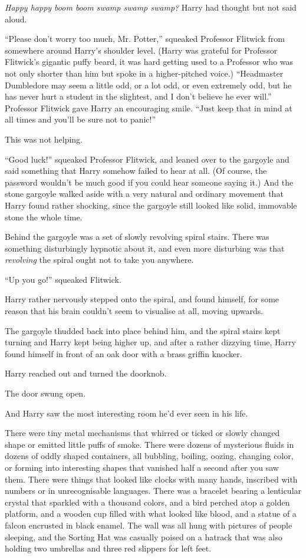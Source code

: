 \emph{Happy happy boom boom swamp swamp swamp?} Harry had thought but not said aloud.

``Please don't worry too much, Mr. Potter,'' squeaked Professor Flitwick from somewhere around Harry's shoulder level. (Harry was grateful for Professor Flitwick's gigantic puffy beard, it was hard getting used to a Professor who was not only shorter than him but spoke in a higher-pitched voice.) ``Headmaster Dumbledore may seem a little odd, or a lot odd, or even extremely odd, but he has never hurt a student in the slightest, and I don't believe he ever will.'' Professor Flitwick gave Harry an encouraging smile. ``Just keep that in mind at all times and you'll be sure not to panic!''

This was not helping.

``Good luck!'' squeaked Professor Flitwick, and leaned over to the gargoyle and said something that Harry somehow failed to hear at all. (Of course, the password wouldn't be much good if you could hear someone saying it.) And the stone gargoyle walked aside with a very natural and ordinary movement that Harry found rather shocking, since the gargoyle still looked like solid, immovable stone the whole time.

Behind the gargoyle was a set of slowly revolving spiral stairs. There was something disturbingly hypnotic about it, and even more disturbing was that \emph{revolving} the spiral ought not to take you anywhere.

``Up you go!'' squeaked Flitwick.

Harry rather nervously stepped onto the spiral, and found himself, for some reason that his brain couldn't seem to visualise at all, moving upwards.

The gargoyle thudded back into place behind him, and the spiral stairs kept turning and Harry kept being higher up, and after a rather dizzying time, Harry found himself in front of an oak door with a brass griffin knocker.

Harry reached out and turned the doorknob.

The door swung open.

And Harry saw the most interesting room he'd ever seen in his life.

There were tiny metal mechanisms that whirred or ticked or slowly changed shape or emitted little puffs of smoke. There were dozens of mysterious fluids in dozens of oddly shaped containers, all bubbling, boiling, oozing, changing color, or forming into interesting shapes that vanished half a second after you saw them. There were things that looked like clocks with many hands, inscribed with numbers or in unrecognisable languages. There was a bracelet bearing a lenticular crystal that sparkled with a thousand colors, and a bird perched atop a golden platform, and a wooden cup filled with what looked like blood, and a statue of a falcon encrusted in black enamel. The wall was all hung with pictures of people sleeping, and the Sorting Hat was casually poised on a hatrack that was also holding two umbrellas and three red slippers for left feet.

